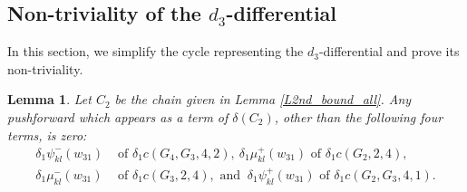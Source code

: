 \documentclass[reqno]{amsart}
\theoremstyle{definition}
\theoremstyle{plain}
\newtheorem{lem}[defi]{Lemma}
\begin{document}
\subsection{Non-triviality of the $d_3$-differential}\label{SS3rd}
In this section, we simplify the cycle representing the $d_3$-differential and prove its non-triviality.
\begin{lem}\label{L3rd_zero}
Let $C_2$ be the chain given in Lemma \ref{L2nd_bound_all}. 
Any pushforward  which appears as a term of $\delta(C_2)$, other than the following four terms, is zero:
\[
\begin{split}
\delta_1\psi^-_{kl}(w_{31}) &\text{ of } \delta_1c(G_4,G_3,4,2), \ \delta_1\mu_{kl}^+(w_{31}) \text{ of } \delta_1c(G_2,2,4), \\
\delta_1\mu_{kl}^-(w_{31})& \text{ of } \delta_1c(G_3,2,4), \text{ and }\  \delta_1\psi^+_{kl}(w_{31}) \text{ of } \delta_1c(G_2,G_3,4,1). 
\end{split}
\]
\end{lem}
\end{document}
